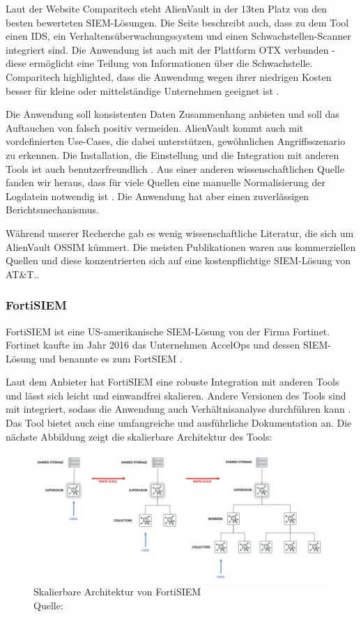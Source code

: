 Laut der Website Comparitech steht AlienVault in der 13ten Platz von den besten bewerteten \gls{SIEM}-Lösungen. Die Seite beschreibt auch, dass zu dem Tool einen \gls{IDS}, ein Verhaltensüberwachungssystem und einen Schwachstellen-Scanner integriert sind. Die Anwendung ist auch mit der Plattform \gls{OTX} verbunden - diese ermöglicht eine Teilung von Informationen über die Schwachstelle. Comparitech highlighted, dass die Anwendung wegen ihrer niedrigen Kosten besser für kleine oder mittelständige Unternehmen geeignet ist \citep{comparitech_SIEM}. 

Die Anwendung soll konsistenten Daten Zusammenhang anbieten und soll das Auftauchen von \gls{falsch positiv} vermeiden. AlienVault kommt auch mit vordefinierten Use-Cases, die dabei unterstützen, gewöhnlichen Angriffsszenario zu erkennen. Die Installation, die Einstellung und die Integration mit anderen Tools ist auch benutzerfreundlich \citep{Gomes_AV}. Aus einer anderen wissenschaftlichen Quelle fanden wir heraus, dass für viele Quellen eine manuelle Normalisierung der Logdatein notwendig ist \citep{Nabil_AV}. Die Anwendung hat aber einen zuverlässigen Berichtsmechanismus. 

Während unserer Recherche gab es wenig wissenschaftliche Literatur, die sich um AlienVault OSSIM kümmert. Die meisten Publikationen waren aus kommerziellen Quellen und diese konzentrierten sich auf eine kostenpflichtige \gls{SIEM}-Lösung von AT\&T..

\subsubsection{FortiSIEM}
FortiSIEM ist eine US-amerikanische \gls{SIEM}-Lösung von der Firma Fortinet. Fortinet kaufte im Jahr 2016 das Unternehmen AccelOps und dessen \gls{SIEM}-Lösung und benannte es zum FortSIEM \citep{Fortinet_Press}. 

Laut dem Anbieter hat FortiSIEM eine robuste Integration mit anderen Tools und lässt sich leicht und einwandfrei skalieren. Andere Versionen des Tools sind mit  integriert, sodass die Anwendung auch Verhältnisanalyse durchführen kann \citep{Fortinet_Solutions}. Das Tool bietet auch eine umfangreiche und ausführliche Dokumentation an. Die nächste Abbildung zeigt die skalierbare Architektur des Tools:

\begin{figure}[H]
   \centering
   \includegraphics[width=1\textwidth]{assets/2_p7.png}
   \caption[Skalierbare Architektur von FortiSIEM]
   {Skalierbare Architektur von FortiSIEM \\Quelle: \citep{Fortinet_Arch} }
   \centering
\end{figure}

